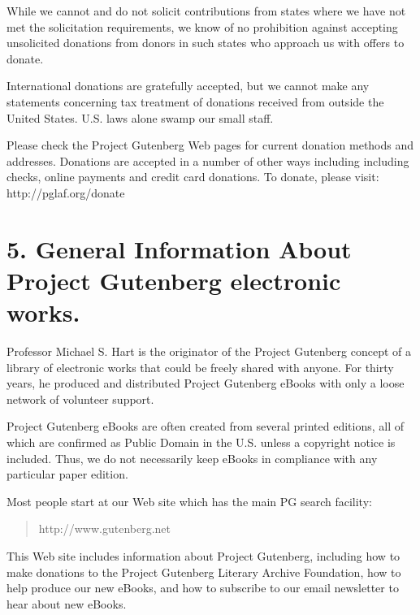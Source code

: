 While we cannot and do not solicit contributions from states where we
have not met the solicitation requirements, we know of no prohibition
against accepting unsolicited donations from donors in such states who
approach us with offers to donate.

International donations are gratefully accepted, but we cannot make
any statements concerning tax treatment of donations received from
outside the United States.  U.S. laws alone swamp our small staff.

Please check the Project Gutenberg Web pages for current donation
methods and addresses.  Donations are accepted in a number of other
ways including including checks, online payments and credit card
donations.  To donate, please visit: http://pglaf.org/donate


\section*{5. General Information About Project Gutenberg\texttrademark{} electronic
works.}

Professor Michael S. Hart is the originator of the Project Gutenberg\texttrademark{}
concept of a library of electronic works that could be freely shared
with anyone.  For thirty years, he produced and distributed Project
Gutenberg\texttrademark{} eBooks with only a loose network of volunteer support.


Project Gutenberg\texttrademark{} eBooks are often created from several printed
editions, all of which are confirmed as Public Domain in the U.S.
unless a copyright notice is included.  Thus, we do not necessarily
keep eBooks in compliance with any particular paper edition.


Most people start at our Web site which has the main PG search facility:
\begin{quote}
     http://www.gutenberg.net  
\end{quote}

This Web site includes information about Project Gutenberg\texttrademark{},
including how to make donations to the Project Gutenberg Literary
Archive Foundation, how to help produce our new eBooks, and how to
subscribe to our email newsletter to hear about new eBooks.
